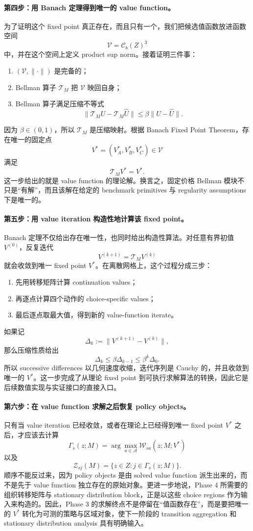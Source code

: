 \paragraph{第四步：用 Banach 定理得到唯一的 value function。}
为了证明这个 fixed point 真正存在，而且只有一个，我们把候选值函数放进函数空间
\[
\mathcal V=\mathcal C_b(Z)^3
\]
中，并在这个空间上定义 product sup norm。接着证明三件事：
\begin{enumerate}
    \item $(\mathcal V,\|\cdot\|)$ 是完备的；
    \item Bellman 算子 $\mathcal T_M$ 把 $\mathcal V$ 映回自身；
    \item Bellman 算子满足压缩不等式
    \[
    \|\mathcal T_MU-\mathcal T_M\widehat U\|\le \beta\|U-\widehat U\|.
    \]
\end{enumerate}
因为 $\beta\in(0,1)$，所以 $\mathcal T_M$ 是压缩映射。根据 Banach Fixed Point Theorem，存在唯一的固定点
\[
V^*=(V_A^*,V_B^*,V_C^*)\in\mathcal V
\]
满足
\[
\mathcal T_MV^*=V^*.
\]
这一步给出的就是 value function 的理论解。换言之，固定价格 Bellman 模块不只是“有解”，而且该解在给定的 benchmark primitives 与 regularity assumptions 下是唯一的。

\paragraph{第五步：用 value iteration 构造性地计算该 fixed point。}
Banach 定理不仅给出存在唯一性，也同时给出构造性算法。对任意有界初值 $V^{(0)}$，反复迭代
\[
V^{(k+1)}=\mathcal T_MV^{(k)}
\]
就会收敛到唯一 fixed point $V^*$。在离散网格上，这个过程分成三步：
\begin{enumerate}
    \item 先用转移矩阵计算 continuation values；
    \item 再逐点计算四个动作的 choice-specific values；
    \item 最后逐点取最大值，得到新的 value-function iterate。
\end{enumerate}
如果记
\[
\Delta_k:=\|V^{(k+1)}-V^{(k)}\|,
\]
那么压缩性质给出
\[
\Delta_k\le \beta\Delta_{k-1}\le \beta^k\Delta_0.
\]
所以 successive differences 以几何速度收缩，迭代序列是 Cauchy 的，并且收敛到唯一的 $V^*$。这一步完成了从理论 fixed point 到可执行求解算法的转换，因此它是后续数值实现与实证接口的直接入口。

\paragraph{第六步：在 value function 求解之后恢复 policy objects。}
只有当 value iteration 已经收敛，或者在理论上已经得到唯一 fixed point $V^*$ 之后，才应该去计算
\[
\Gamma_s(z;M)=\arg\max_{a\in\mathcal A}\mathcal W_{sa}(z;M;V^*)
\]
以及
\[
\mathcal Z_{sj}(M)=\{z\in Z:j\in\Gamma_s(z;M)\}.
\]
顺序不能反过来，因为 policy objects 是由 solved value function 派生出来的，而不是先于 value function 独立存在的原始对象。更进一步地说，Phase 4 所需要的组织转移矩阵与 stationary distribution block，正是以这些 choice regions 作为输入来构造的。因此，Phase 3 的求解终点不是停留在“值函数存在”，而是要把唯一的 $V^*$ 转化为可测的策略与区域对象，使下一阶段的 transition aggregation 和 stationary distribution analysis 具有明确输入。

